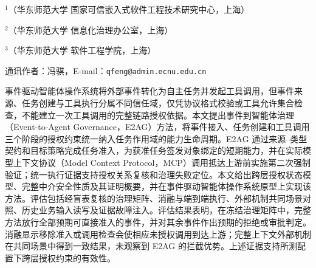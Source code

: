 \thispagestyle{josfirst}


\vspace{7pt}

\vspace{4pt}
\begingroup\fontsize{8pt}{12pt}\selectfont
\noindent$^{1}$（华东师范大学 国家可信嵌入式软件工程技术研究中心，上海）\par
\noindent$^{2}$（华东师范大学 信息化治理办公室，上海）\par
\noindent$^{3}$（华东师范大学 软件工程学院，上海）\par
\noindent 通讯作者：冯骐，E-mail：\texttt{qfeng@admin.ecnu.edu.cn}\par
\endgroup

\begin{joszhabstract}
事件驱动智能体操作系统将外部事件转化为自主任务并发起工具调用，但事件来源、任务创建与工具执行分属不同信任域，仅凭协议格式校验或工具允许集合检查，不能建立一次工具调用的完整链路授权依据。本文提出事件到智能体治理（Event-to-Agent Governance，E2AG）方法，将事件接入、任务创建和工具调用三个阶段的授权约束统一纳入任务作用域的能力生命周期。E2AG 通过来源--类型契约和目标策略完成任务准入，为获准任务签发对象绑定的短期能力，并在实际模型上下文协议（Model Context Protocol，MCP）调用抵达上游前实施第二次强制验证；统一执行证据支持授权关系复核和治理失败定位。本文给出跨层授权状态模型、完整中介安全性质及其证明概要，并在事件驱动智能体操作系统原型上实现该方法。评估包括经盲表复核的治理矩阵、消融与端到端执行、外部机制共同场景对照、历史业务输入读写及证据故障注入。评估结果表明，在冻结治理矩阵中，完整方法放行全部预期可直接准入的事件，并对其余事件作出预期的拒绝或审批判定。消融显示移除准入或调用检查会使相应未授权调用到达上游；完整上下文外部机制在共同场景中得到一致结果，未观察到 E2AG 的拦截优势。上述证据支持所测配置下跨层授权约束的有效性。
\end{joszhabstract}

